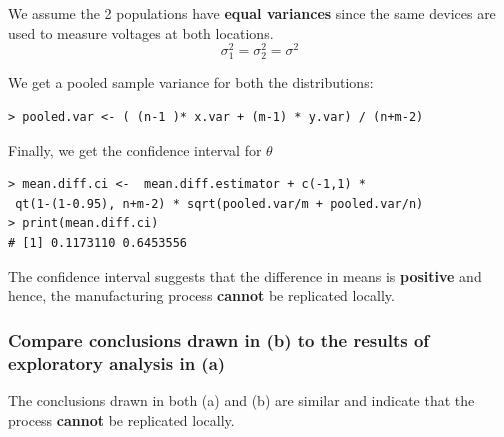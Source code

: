 \documentclass[12pt,letterpaper,titlepage,en-US]{article}
\begin{document}
We assume the 2 populations have \textbf{equal variances} since the same devices are used to measure voltages at both locations.
\begin{equation}
\sigma_{1}^{2} = \sigma^{2}_{2}= \sigma^{2}
\end{equation}

We get a pooled sample variance for both the distributions:
\begin{knitrout}
\color{fgcolor}
\begin{kframe}
\begin{verbatim}
> pooled.var <- ( (n-1 )* x.var + (m-1) * y.var) / (n+m-2)
\end{verbatim}
\end{kframe}
\end{knitrout}

Finally, we get the confidence interval for $\theta$
\begin{knitrout}
\color{fgcolor}
\begin{kframe}
\begin{verbatim}
> mean.diff.ci <-  mean.diff.estimator + c(-1,1) *
 qt(1-(1-0.95), n+m-2) * sqrt(pooled.var/m + pooled.var/n)
> print(mean.diff.ci)
# [1] 0.1173110 0.6453556
\end{verbatim}
\end{kframe}
\end{knitrout}

The confidence interval suggests that the difference in means is \textbf{positive} and hence, the manufacturing process \textbf{cannot} be replicated locally.


\subsubsection{Compare conclusions drawn in (b) to the results of exploratory analysis in (a)}
The conclusions drawn in both (a) and (b) are similar and indicate that the process \textbf{cannot} be replicated locally.
\end{document}
